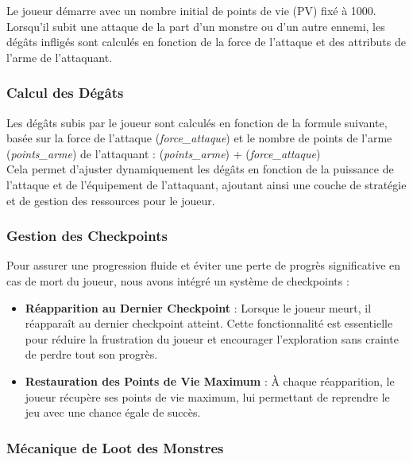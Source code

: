 Le joueur démarre avec un nombre initial de points de vie (PV) fixé à 1000. Lorsqu'il subit une attaque de la part d'un monstre ou d'un autre ennemi, les dégâts infligés sont calculés en fonction de la force de l'attaque et des attributs de l'arme de l'attaquant.

\subsubsection{Calcul des Dégâts}

Les dégâts subis par le joueur sont calculés en fonction de la formule suivante, basée sur la force de l'attaque (\textit{force\_attaque}) et le nombre de points de l'arme (\textit{points\_arme}) de l'attaquant : (\textit{points\_arme}) + (\textit{force\_attaque})
\\

Cela permet d'ajuster dynamiquement les dégâts en fonction de la puissance de l'attaque et de l'équipement de l'attaquant, ajoutant ainsi une couche de stratégie et de gestion des ressources pour le joueur.

\subsubsection{Gestion des Checkpoints}

Pour assurer une progression fluide et éviter une perte de progrès significative en cas de mort du joueur, nous avons intégré un système de checkpoints :
\\

\begin{itemize}
      \item \textbf{Réapparition au Dernier Checkpoint} : Lorsque le joueur meurt, il réapparaît au dernier checkpoint atteint. Cette fonctionnalité est essentielle pour réduire la frustration du joueur et encourager l'exploration sans crainte de perdre tout son progrès.
            \\

      \item \textbf{Restauration des Points de Vie Maximum} : À chaque réapparition, le joueur récupère ses points de vie maximum, lui permettant de reprendre le jeu avec une chance égale de succès.
\end{itemize}

\subsubsection{Mécanique de Loot des Monstres}

